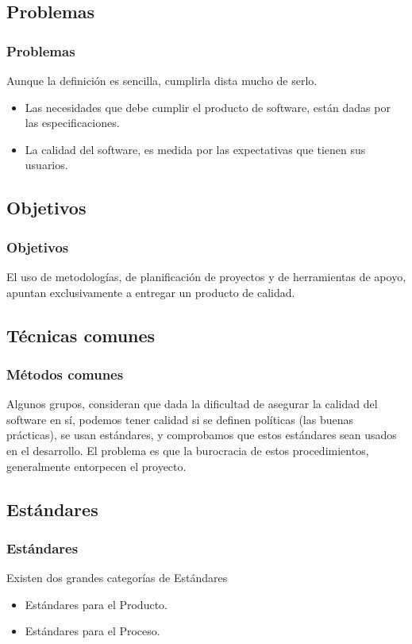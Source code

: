 \documentclass[12pt]{beamer}
\begin{document}
\subsection{Problemas}
\begin{frame}
\frametitle{Problemas}
Aunque la definición es sencilla, cumplirla dista mucho de serlo.
\begin{itemize}
 \item<2-> Las necesidades que debe cumplir el producto de software, están dadas por las \alert{especificaciones}.
 \item<3-> La calidad del software, es medida por las \alert{expectativas} que tienen sus usuarios.
\end{itemize}
\end{frame}

\subsection{Objetivos}
\begin{frame}
\frametitle{Objetivos}
El uso de metodologías, de planificación de proyectos y de herramientas de apoyo, apuntan exclusivamente a entregar un producto de \alert{calidad}.
\end{frame}

\subsection{Técnicas comunes}
\begin{frame}
\frametitle{Métodos comunes}
Algunos grupos, consideran que dada la dificultad de asegurar la calidad del software en sí, podemos tener calidad si se definen políticas 
(las buenas prácticas), se usan estándares, y comprobamos que estos estándares sean usados en el desarrollo.
El problema es que la burocracia de estos procedimientos, generalmente entorpecen el proyecto.
\end{frame}

\subsection{Estándares}

\begin{frame}
 \frametitle{Estándares}
 Existen dos grandes categorías de Estándares
 \begin{itemize}
  \item<2-> Estándares para el Producto.
  \item<3-> Estándares para el Proceso.
 \end{itemize}
\end{frame}
\end{document}

